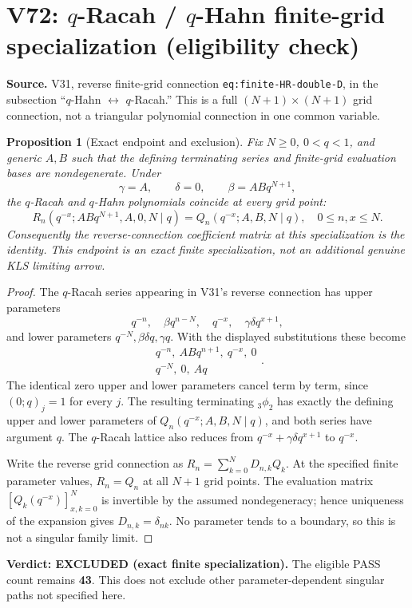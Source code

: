 \documentclass[11pt]{article}
\newtheorem{proposition}{Proposition}
\begin{document}
\section{V72: $q$-Racah / $q$-Hahn finite-grid specialization (eligibility check)}
\noindent\textbf{Source.} V31, reverse finite-grid connection
\texttt{eq:finite-HR-double-D}, in the subsection
``$q$-Hahn $\leftrightarrow$ $q$-Racah.'' This is a full
$(N+1)\times(N+1)$ grid connection, not a triangular polynomial
connection in one common variable.

\begin{proposition}[Exact endpoint and exclusion]
Fix $N\geq0$, $0<q<1$, and generic $A,B$ such that the defining
terminating series and finite-grid evaluation bases are nondegenerate.
Under
\[
 \gamma=A,\qquad \delta=0,\qquad
 \beta=ABq^{N+1},
\]
the $q$-Racah and $q$-Hahn polynomials coincide at every grid point:
\[
 \boxed{\ R_n(q^{-x};ABq^{N+1},A,0,N\mid q)
 =Q_n(q^{-x};A,B,N\mid q),\quad 0\leq n,x\leq N.\ }
\]
Consequently the reverse-connection coefficient matrix at this
specialization is the identity. This endpoint is an exact finite
specialization, not an additional genuine KLS limiting arrow.
\end{proposition}
\begin{proof}
The $q$-Racah series appearing in V31's reverse connection has upper
parameters
\[
 q^{-n},\quad \beta q^{n-N},\quad q^{-x},\quad
 \gamma\delta q^{x+1},
\]
and lower parameters $q^{-N},\beta\delta q,\gamma q$.
With the displayed substitutions these become
\[
 \begin{matrix}q^{-n},\ ABq^{n+1},\ q^{-x},\ 0\\
 q^{-N},\ 0,\ Aq\end{matrix}.
\]
The identical zero upper and lower parameters cancel term by term,
since $(0;q)_j=1$ for every $j$. The resulting terminating
${}_3\phi_2$ has exactly the defining upper and lower parameters of
$Q_n(q^{-x};A,B,N\mid q)$, and both series have argument $q$.
The $q$-Racah lattice also reduces from
$q^{-x}+\gamma\delta q^{x+1}$ to $q^{-x}$.

Write the reverse grid connection as $R_n=\sum_{k=0}^N D_{n,k}Q_k$.
At the specified finite parameter values, $R_n=Q_n$ at all $N+1$
grid points. The evaluation matrix $[Q_k(q^{-x})]_{x,k=0}^N$ is
invertible by the assumed nondegeneracy; hence uniqueness of the
expansion gives $D_{n,k}=\delta_{nk}$. No parameter tends to a
boundary, so this is not a singular family limit.
\end{proof}
\noindent\textbf{Verdict: EXCLUDED (exact finite specialization).}
The eligible PASS count remains \textbf{43}. This does not exclude
other parameter-dependent singular paths not specified here.
\end{document}
